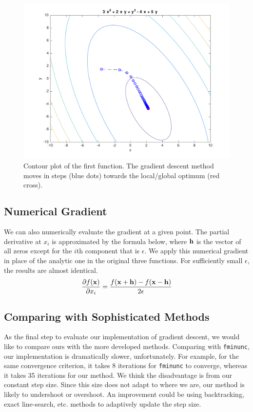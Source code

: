\begin{figure}[h!]
\centering
\includegraphics[scale=0.4]{hw1_1.pdf}
\caption{Contour plot of the first function. The gradient descent method moves in steps (blue dots) towards the local/global optimum (red cross).}
\end{figure}


\subsection{Numerical Gradient}
We can also numerically evaluate the gradient at a given point. The partial derivative at $x_i$ is approximated by the formula below, where $\boldsymbol{\mathbf{h}}$ is the vector of all zeros except for the $i$th component that is $\epsilon$.  We apply this numerical gradient in place of the analytic one in the original three functions.  For sufficiently small $\epsilon$, the results are almost identical.
%
\begin{equation}
\frac{\partial f(\boldsymbol{\mathbf{x}})}{\partial x_i} = \frac{f(\boldsymbol{\mathbf{x}}+\boldsymbol{\mathbf{h}}) - f(\boldsymbol{\mathbf{x}}-\boldsymbol{\mathbf{h}})}{2\epsilon}
\end{equation}

\subsection{Comparing with Sophisticated Methods}
As the final step to evaluate our implementation of gradient descent, we would like to compare ours with the more developed methods. Comparing with \texttt{fminunc}, our implementation is dramatically slower, unfortunately. For example, for the same convergence criterion, it takes 8 iterations for \texttt{fminunc} to converge, whereas it takes 35 iterations for our method. We think the disadvantage is from our constant step size. Since this size does not adapt to where we are, our method is likely to undershoot or overshoot. An improvement could be using backtracking, exact line-search, etc. methods to adaptively update the step size.  
